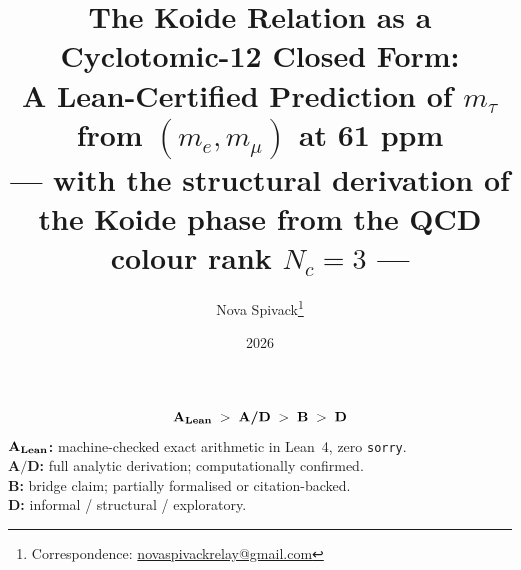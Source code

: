 \documentclass[11pt]{article}
\title{\bfseries The Koide Relation as a Cyclotomic-12 Closed Form: \\
A Lean-Certified Prediction of $m_\tau$ from $(m_e, m_\mu)$ at 61 ppm \\[0.4em]
\normalsize\normalfont --- with the structural derivation of the Koide phase from the QCD colour rank $N_c = 3$ ---}
\author[1]{Nova Spivack\thanks{Correspondence: \href{mailto:novaspivackrelay@gmail.com}{novaspivackrelay@gmail.com}}}
\affil[1]{Independent Research}
\date{2026}
\newcommand{\CatAL}{\textbf{A\textsubscript{Lean}}}
\newcommand{\CatAD}{\textbf{A/D}}
\newcommand{\CatB}{\textbf{B}}
\newcommand{\CatD}{\textbf{D}}
\theoremstyle{remark}
\begin{document}
\maketitle
\NovaZenodoAfterTitle

\begin{tcolorbox}[colback=gray!4,colframe=gray!50!black,
  title={\textbf{Claim-strength taxonomy}},
  fonttitle=\bfseries,left=6pt,right=6pt,top=5pt,bottom=5pt]
\small
\[
\CatAL \;>\; \CatAD \;>\; \CatB \;>\; \CatD
\]
\textbf{$\CatAL$:} machine-checked exact arithmetic in Lean~4, zero \texttt{sorry}.\\
\textbf{$\CatAD$:} full analytic derivation; computationally confirmed.\\
\textbf{$\CatB$:} bridge claim; partially formalised or citation-backed.\\
\textbf{$\CatD$:} informal / structural / exploratory.
\end{tcolorbox}
\end{document}
